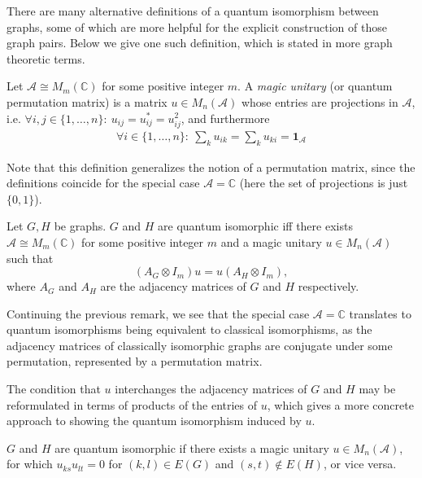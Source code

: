 There are many alternative definitions of a quantum isomorphism between graphs,
some of which are more helpful for the explicit construction of those graph pairs.
%
Below we give one such definition,
which is stated in more graph theoretic terms.
\begin{definition}
Let $\mathcal{A} \cong M_m(\mathbb{C})$ for some positive integer $m$.
A \emph{magic unitary} (or quantum permutation matrix) is a matrix $u \in M_n(\mathcal{A})$
whose entries are projections in $\mathcal{A}$, i.e.
$\forall i,j \in \{1,\dots, n\}:~u_{ij} = u_{ij}^* = u_{ij}^2$, and furthermore
\begin{align}
    \forall i \in \{1,\dots, n\}:~\sum_k u_{ik} = \sum_k u_{ki} = \mathbf{1}_\mathcal{A}
\end{align}
\end{definition}
\begin{remark}
    Note that this definition generalizes the notion of
    a permutation matrix, since the definitions coincide for 
    the special case $\mathcal{A} = \mathbb{C}$
    (here the set of projections is just $\{0,1 \}$).
\end{remark}

\begin{lemma}
    Let $G, H$ be graphs. $G$ and $H$ are quantum isomorphic iff
    there exists $\mathcal{A} \cong M_m(\mathbb{C})$ for some positive
    integer $m$ and
    a magic unitary $u \in M_n(\mathcal{A})$ such that 
    \[ (A_G \otimes I_m) u = u (A_H \otimes I_m), \]
    where $A_G$ and $A_H$ are the adjacency matrices of $G$ and $H$ respectively.
\end{lemma}
\begin{remark}
    Continuing the previous remark, we see that the special case 
    $\mathcal{A} = \mathbb{C}$ translates to quantum isomorphisms
    being equivalent to classical isomorphisms, as the adjacency
    matrices of classically isomorphic graphs are conjugate
    under some permutation, represented by a permutation matrix.
\end{remark}
The condition that $u$ interchanges the adjacency matrices of $G$ and $H$ may 
be reformulated in terms of products of the entries of $u$, which gives a more
concrete approach to showing the quantum isomorphism induced by $u$.
\begin{lemma}\label{lem:prod2}
    $G$ and $H$ are quantum isomorphic if there exists a magic unitary $u \in M_n(\mathcal{A})$,
    for which $u_{ks} u_{lt} = 0$ for $(k, l) \in E(G)$ and $(s, t) \not \in E(H)$, or vice versa.
\end{lemma}

